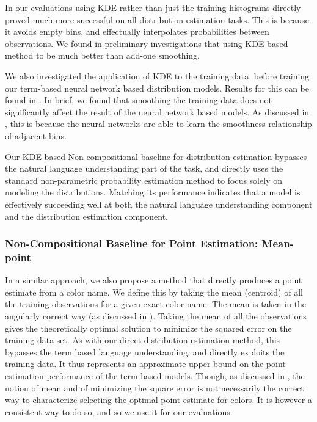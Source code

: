 \documentclass[]{clv3}
\newcommand{\empmodel}{Non-compositional baseline}
\begin{document}
In our evaluations using KDE rather than just the training histograms directly proved much more successful on all distribution estimation tasks.
This is because it avoids empty bins, and effectually interpolates probabilities between observations.
We found in preliminary investigations that using KDE-based method to be much better than add-one smoothing.

We also investigated the application of KDE to the training data,  before training our term-based neural network based distribution models.
Results for this can be found in .
In brief, we found that smoothing the training data does not significantly affect the result of the neural network based models.
As discussed in , this is because the neural networks are able to learn the smoothness relationship of adjacent bins.


Our KDE-based \empmodel{} for distribution estimation bypasses the natural language understanding part of the task,
and directly uses the standard non-parametric probability estimation method to focus solely on modeling the distributions.
Matching its performance indicates that a model is effectively succeeding well at both the natural language understanding component and the distribution estimation component.


\subsubsection{Non-Compositional Baseline for Point Estimation: Mean-point}
In a similar approach, we also propose a method that directly produces a point estimate from a color name.
We define this by taking the mean (centroid) of all the training observations for a given exact color name.
The mean is taken in the angularly correct way (as discussed in ).
Taking the mean of all the observations gives the theoretically optimal solution to minimize the squared error on the training data set.
As with our direct distribution estimation method, this bypasses the term based language understanding, and directly exploits the training data.
It thus represents an approximate upper bound on the point estimation performance of the term based models.
Though, as discussed in , the notion of mean and of minimizing the square error is not necessarily the correct way to characterize selecting the optimal point estimate for colors.
It is however a consistent way to do so, and so we use it for our evaluations.
\end{document}
